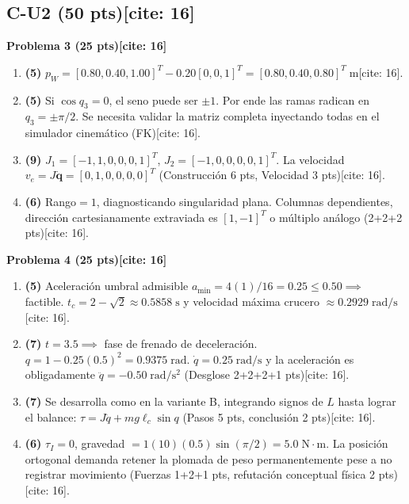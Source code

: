 \documentclass[11pt, a4paper]{article}
\begin{document}
\subsection*{C-U2 (50 pts)[cite: 16]}
\textbf{Problema 3 (25 pts)[cite: 16]}
\begin{enumerate}\footnotesize
    \item \textbf{(5)} $p_W = [0.80, 0.40, 1.00]^T - 0.20[0,0,1]^T = [0.80, 0.40, 0.80]^T\;\mathrm{m}$[cite: 16].
    \item \textbf{(5)} Si $\cos q_3 = 0$, el seno puede ser $\pm 1$. Por ende las ramas radican en $q_3 = \pm \pi/2$. Se necesita validar la matriz completa inyectando todas en el simulador cinemático (FK)[cite: 16].
    \item \textbf{(9)} $J_1 = [-1, 1, 0, 0, 0, 1]^T$, $J_2 = [-1, 0, 0, 0, 0, 1]^T$. La velocidad $v_e = J\dot{\mathbf{q}} = [0, 1, 0, 0, 0, 0]^T$ (Construcción 6 pts, Velocidad 3 pts)[cite: 16].
    \item \textbf{(6)} Rango$=1$, diagnosticando singularidad plana. Columnas dependientes, dirección cartesianamente extraviada es $[1, -1]^T$ o múltiplo análogo (2+2+2 pts)[cite: 16].
\end{enumerate}
\textbf{Problema 4 (25 pts)[cite: 16]}
\begin{enumerate}\footnotesize
    \item \textbf{(5)} Aceleración umbral admisible $a_{\min} = 4(1)/16 = 0.25 \le 0.50 \implies$ factible. $t_c = 2 - \sqrt{2} \approx 0.5858\;\mathrm{s}$ y velocidad máxima crucero $\approx 0.2929\;\mathrm{rad/s}$[cite: 16].
    \item \textbf{(7)} $t = 3.5 \implies$ fase de frenado de deceleración.
    $q = 1 - 0.25(0.5)^2 = 0.9375\;\mathrm{rad}$. $\dot{q} = 0.25\;\mathrm{rad/s}$ y la aceleración es obligadamente $\ddot{q} = -0.50\;\mathrm{rad/s^2}$ (Desglose 2+2+2+1 pts)[cite: 16].
    \item \textbf{(7)} Se desarrolla como en la variante B, integrando signos de $L$ hasta lograr el balance: $\tau = J\ddot{q} + mg\ell_c\sin q$ (Pasos 5 pts, conclusión 2 pts)[cite: 16].
    \item \textbf{(6)} $\tau_I = 0$, gravedad $= 1(10)(0.5)\sin(\pi/2) = 5.0\;\mathrm{N\cdot m}$. La posición ortogonal demanda retener la plomada de peso permanentemente pese a no registrar movimiento (Fuerzas 1+2+1 pts, refutación conceptual física 2 pts)[cite: 16].
\end{enumerate}
\end{document}
